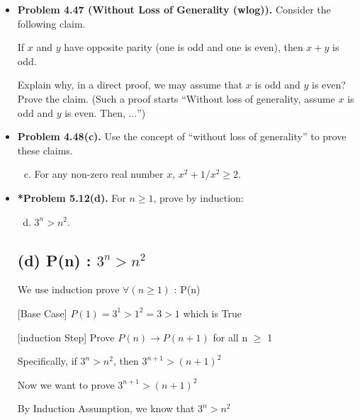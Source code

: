 \documentclass[11pt]{article}
\def\imp{\rightarrow}
\begin{document}
\begin{itemize}
\newpage


\item \textbf{Problem 4.47 (Without Loss of Generality (wlog)).}
  Consider the following claim.
  \begin{center}
  If $x$ and $y$ have opposite parity (one is odd and one is even),
  then $x+y$ is odd.
  \end{center}
  Explain why, in a direct proof, we may assume that $x$ is odd and $y$ is even?
  Prove the claim.
  (Such a proof starts ``Without loss of generality, assume $x$ is odd and $y$ is even.
  Then, $\ldots$'')

\vspace{0.1in}

\item \textbf{Problem 4.48(c).}
  Use the concept of ``without loss of generality'' to prove these claims.
  \begin{enumerate}[(a)]
  \setcounter{enumi}{2}
  \item For any non-zero real number $x$, $x^2+1/x^2\ge 2$.
  \end{enumerate}

\vspace{0.1in}


\item \textbf{*Problem 5.12(d).}
  For $n\ge 1$, prove by induction:
  \begin{enumerate}[(a)]
  \setcounter{enumi}{3}
  \item $3^n>n^2$.
  \end{enumerate}

  \subsection*{(d) P(n) : \(3^n > n^2\)}
  We use induction prove $\forall(n \geq 1)$ : P(n)
  
  [Base Case] $P(1) = 3^1 > 1^2 = 3 > 1$ which is True

  [induction Step] Prove $P(n) \imp P(n+1)$ for all n $\geq$ 1 

  Specifically, if $3^n > n^2$, then $3^{n+1} > (n+1)^2$

  Now we want to prove $3^{n+1} > (n+1)^2$

  By Induction Assumption, we know that $3^n > n^2$


\end{itemize}
\end{document}

